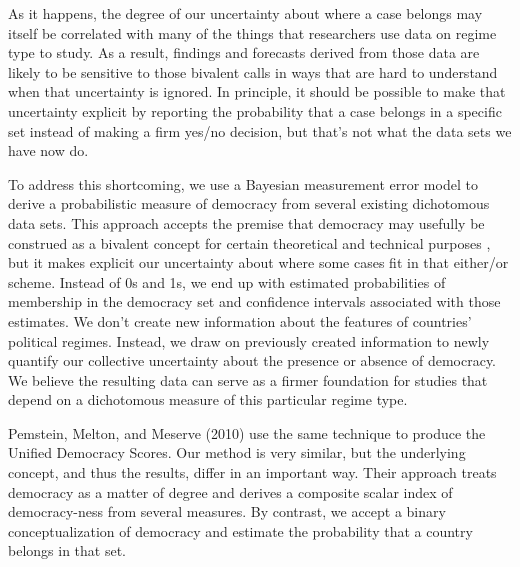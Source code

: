 \documentclass[letterpaper]{article}
\begin{document}
As it happens, the degree of our uncertainty about where a case belongs may itself be correlated with many of the things that researchers use data on regime type to study. As a result, findings and forecasts derived from those data are likely to be sensitive to those bivalent calls in ways that are hard to understand when that uncertainty is ignored. In principle, it should be possible to make that uncertainty explicit by reporting the probability that a case belongs in a specific set instead of making a firm yes/no decision, but that’s not what the data sets we have now do.

To address this shortcoming, we use a Bayesian measurement error model to derive a probabilistic measure of democracy from several existing dichotomous data sets. This approach accepts the premise that democracy may usefully be construed as a bivalent concept for certain theoretical and technical purposes , but it makes explicit our uncertainty about where some cases fit in that either/or scheme. Instead of 0s and 1s, we end up with estimated probabilities of membership in the democracy set and confidence intervals associated with those estimates. We don’t create new information about the features of countries’ political regimes. Instead, we draw on previously created information to newly quantify our collective uncertainty about the presence or absence of democracy. We believe the resulting data can serve as a firmer foundation for studies that depend on a dichotomous measure of this particular regime type.

Pemstein, Melton, and Meserve (2010) \cite{uds} use the same technique to produce the Unified Democracy Scores. Our method is very similar, but the underlying concept, and thus the results, differ in an important way. Their approach treats democracy as a matter of degree and derives a composite scalar index of democracy-ness from several measures. By contrast, we accept a binary conceptualization of democracy and estimate the probability that a country belongs in that set.
\end{document}
